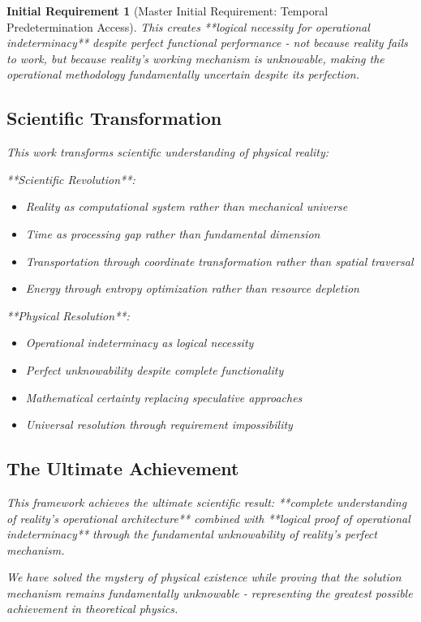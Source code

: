 \documentclass[12pt,a4paper]{article}
\newtheorem{requirement}[theorem]{Initial Requirement}
\theoremstyle{remark}
\begin{document}
\begin{requirement}[Master Initial Requirement: Temporal Predetermination Access]
This creates **logical necessity for operational indeterminacy** despite perfect functional performance - not because reality fails to work, but because reality's working mechanism is unknowable, making the operational methodology fundamentally uncertain despite its perfection.

\subsection{Scientific Transformation}

This work transforms scientific understanding of physical reality:

**Scientific Revolution**:
\begin{itemize}
\item Reality as computational system rather than mechanical universe
\item Time as processing gap rather than fundamental dimension
\item Transportation through coordinate transformation rather than spatial traversal
\item Energy through entropy optimization rather than resource depletion
\end{itemize}

**Physical Resolution**:
\begin{itemize}
\item Operational indeterminacy as logical necessity
\item Perfect unknowability despite complete functionality
\item Mathematical certainty replacing speculative approaches
\item Universal resolution through requirement impossibility
\end{itemize}

\subsection{The Ultimate Achievement}

This framework achieves the ultimate scientific result: **complete understanding of reality's operational architecture** combined with **logical proof of operational indeterminacy** through the fundamental unknowability of reality's perfect mechanism.

We have solved the mystery of physical existence while proving that the solution mechanism remains fundamentally unknowable - representing the greatest possible achievement in theoretical physics.


\end{requirement}
\end{document}
